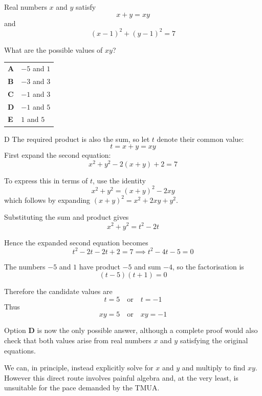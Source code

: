 \documentclass[11pt,a4paper]{article}
\begin{document}
\clearpage
\thispagestyle{djssolutions}
\vspace*{8pt}
\begin{enumerate}[label=\textbf{\arabic*.},leftmargin=*,itemsep=0pt,start=10]
\questionitem[Algebra]
Real numbers $x$ and $y$ satisfy
\[x+y=xy\]
and
\[(x-1)^2+(y-1)^2=7\]

What are the possible values of $xy$?

\par\vspace*{12pt}
\begin{tabularx}{\linewidth}{@{}>{\bfseries}l Y@{}}
A &
$-5$ and $1$
\\[0.8em]
B &
$-3$ and $3$
\\[0.8em]
C &
$-1$ and $3$
\\[0.8em]
D &
$-1$ and $5$
\\[0.8em]
E &
$1$ and $5$
\\
\end{tabularx}

\begin{djsSolution}{D}
The required product is also the sum, so let $t$ denote their common value:
\[
t=x+y=xy
\]
First expand the second equation:
\[
x^2+y^2-2(x+y)+2=7
\]

To express this in terms of $t$, use the identity
\[
x^2+y^2=(x+y)^2-2xy
\]
which follows by expanding $(x+y)^2=x^2+2xy+y^2$.

Substituting the sum and product gives
\[
x^2+y^2=t^2-2t
\]

Hence the expanded second equation becomes
\[
t^2-2t-2t+2=7 \implies t^2-4t-5=0
\]

The numbers $-5$ and $1$ have product $-5$ and sum $-4$, so the factorisation is
\[
(t-5)(t+1)=0
\]

Therefore the candidate values are
\[
t=5\quad\text{or}\quad t=-1
\]
Thus 
\[
\boxed{xy=5\quad\text{or}\quad xy=-1}
\]

Option \textbf{D} is now the only possible answer, although a complete proof would also check that both values arise from real numbers $x$ and $y$ satisfying the original equations.

We can, in principle, instead explicitly solve for $x$ and $y$ and multiply to find $xy$. However this direct route involves painful algebra and, at the very least, is unsuitable for the pace demanded by the TMUA. 
\end{djsSolution}
\end{enumerate}
\end{document}
